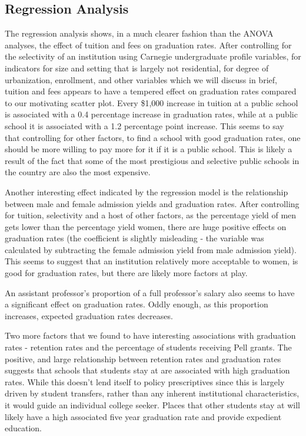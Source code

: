 \documentclass{article}
\begin{document}
\subsection{Regression Analysis}

The regression analysis shows, in a much clearer fashion than the ANOVA analyses, the effect of tuition and fees on graduation rates. After controlling for the selectivity of an institution using Carnegie undergraduate profile variables, for indicators for size and setting that is largely not residential, for degree of urbanization, enrollment, and other variables which we will discuss in brief, tuition and fees appears to have a tempered effect on graduation rates compared to our motivating scatter plot. Every \$1,000 increase in tuition at a public school is associated with a 0.4 percentage increase in graduation rates, while at a public school it is associated with a 1.2 percentage point increase. This seems to say that controlling for other factors, to find a school with good graduation rates, one should be more willing to pay more for it if it is a public school. This is likely a result of the fact that some of the most prestigious and selective public schools in the country are also the most expensive.

Another interesting effect indicated by the regression model is the relationship between male and female admission yields and graduation rates. After controlling for tuition, selectivity and a host of other factors, as the percentage yield of men gets lower than the percentage yield women, there are huge positive effects on graduation rates (the coefficient is slightly misleading - the variable was calculated by subtracting the female admission yield from male admission yield). This seems to suggest that an institution relatively more acceptable to women, is good for graduation rates, but there are likely more factors at play.

An assistant professor's proportion of a full professor's salary also seems to have a significant effect on graduation rates. Oddly enough, as this proportion increases, expected graduation rates decreases.

Two more factors that we found to have interesting associations with graduation rates - retention rates and the percentage of students receiving Pell grants. The positive, and large relationship between retention rates and graduation rates suggests that schools that students stay at are associated with high graduation rates. While this doesn't lend itself to policy prescriptives since this is largely driven by student transfers, rather than any inherent institutional characteristics, it would guide an individual college seeker. Places that other students stay at will likely have a high associated five year graduation rate and provide expedient education. 
\end{document}
